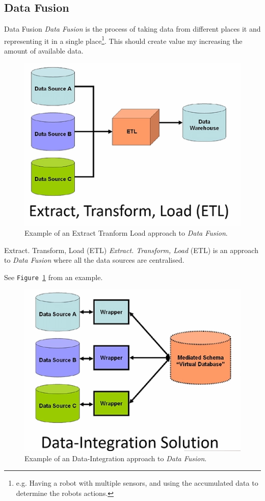 \documentclass[11pt,a4paper]{article}
\begin{document}
\subsection{Data Fusion}

  \begin{definition}{Data Fusion}
    \textit{Data Fusion} is the process of taking data from different places it and representing it in a single place\footnote{e.g. Having a robot with multiple sensors, and using the accumulated data to determine the robots actions.}. This should create value my increasing the amount of available data.
  \end{definition}

  \begin{figure}[H]
    \centering\includegraphics[width=.7\textwidth]{ETL.PNG}
    \caption{Example of an Extract Tranform Load approach to \textit{Data Fusion}.}
    \label{fig_ETL}
  \end{figure}

  \begin{proposition}{Extract. Transform, Load (ETL)}
    \textit{Extract. Transform, Load} (ETL) is an approach to \textit{Data Fusion} where all the data sources are centralised.
    \par See \texttt{Figure \ref{fig_ETL}} from an example.
  \end{proposition}

  \begin{figure}[H]
    \centering\includegraphics[width=.7\textwidth]{DataIntegration.PNG}
    \caption{Example of an Data-Integration approach to \textit{Data Fusion}.}
    \label{fig_data_integration}
  \end{figure}
\end{document}
